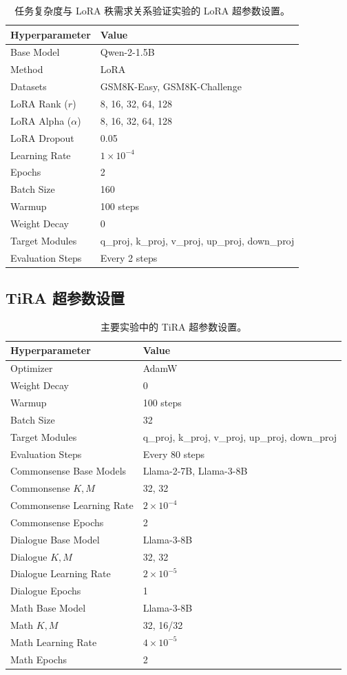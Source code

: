 \documentclass[UTF8,a4paper,11pt]{ctexart}
\begin{document}
\begin{table}[H]
\centering
\caption{任务复杂度与 LoRA 秩需求关系验证实验的 LoRA 超参数设置。}
\begin{tabular}{ll}
\toprule
Hyperparameter & Value \\
\midrule
Base Model & Qwen-2-1.5B \\
Method & LoRA \\
Datasets & GSM8K-Easy, GSM8K-Challenge \\
LoRA Rank ($r$) & 8, 16, 32, 64, 128 \\
LoRA Alpha ($\alpha$) & 8, 16, 32, 64, 128 \\
LoRA Dropout & 0.05 \\
Learning Rate & $1\times10^{-4}$ \\
Epochs & 2 \\
Batch Size & 160 \\
Warmup & 100 steps \\
Weight Decay & 0 \\
Target Modules & q\_proj, k\_proj, v\_proj, up\_proj, down\_proj \\
Evaluation Steps & Every 2 steps \\
\bottomrule
\end{tabular}
\end{table}

\subsection{TiRA 超参数设置}
\label{app:tira_hyperparams}

\begin{table}[H]
\centering
\caption{主要实验中的 TiRA 超参数设置。}
\begin{tabular}{ll}
\toprule
Hyperparameter & Value \\
\midrule
Optimizer & AdamW \\
Weight Decay & 0 \\
Warmup & 100 steps \\
Batch Size & 32 \\
Target Modules & q\_proj, k\_proj, v\_proj, up\_proj, down\_proj \\
Evaluation Steps & Every 80 steps \\
\midrule
Commonsense Base Models & Llama-2-7B, Llama-3-8B \\
Commonsense $K,M$ & 32, 32 \\
Commonsense Learning Rate & $2\times10^{-4}$ \\
Commonsense Epochs & 2 \\
\midrule
Dialogue Base Model & Llama-3-8B \\
Dialogue $K,M$ & 32, 32 \\
Dialogue Learning Rate & $2\times10^{-5}$ \\
Dialogue Epochs & 1 \\
\midrule
Math Base Model & Llama-3-8B \\
Math $K,M$ & 32, 16/32 \\
Math Learning Rate & $4\times10^{-5}$ \\
Math Epochs & 2 \\
\bottomrule
\end{tabular}
\end{table}
\end{document}
